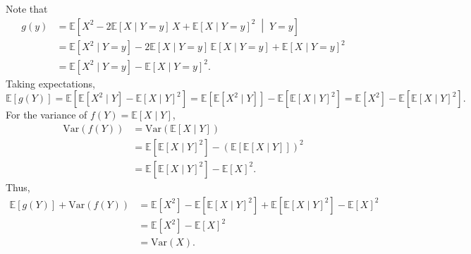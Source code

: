 \documentclass[a4paper,12pt]{article}
\begin{document}
Note that
\begin{align*}
    g(y) &= \mathbb{E}\left[X^2 - 2\mathbb{E}[X \mid Y=y]\,X + \mathbb{E}[X \mid Y=y]^2 \;\middle|\; Y=y\right] \\
         &= \mathbb{E}[X^2 \mid Y=y] - 2\mathbb{E}[X \mid Y=y]\,\mathbb{E}[X \mid Y=y] + \mathbb{E}[X \mid Y=y]^2 \\
         &= \mathbb{E}[X^2 \mid Y=y] - \mathbb{E}[X \mid Y=y]^2.
\end{align*}
Taking expectations,
\[
    \mathbb{E}[g(Y)] = \mathbb{E}\left[\mathbb{E}[X^2 \mid Y] - \mathbb{E}[X \mid Y]^2\right]
    = \mathbb{E}\left[\mathbb{E}[X^2 \mid Y]\right] - \mathbb{E}\left[\mathbb{E}[X \mid Y]^2\right]
    = \mathbb{E}[X^2] - \mathbb{E}\left[\mathbb{E}[X \mid Y]^2\right].
\]
For the variance of $f(Y) = \mathbb{E}[X \mid Y]$,
\begin{align*}
    \mathrm{Var}(f(Y)) &= \mathrm{Var}(\mathbb{E}[X \mid Y]) \\
    &= \mathbb{E}\left[\mathbb{E}[X \mid Y]^2\right] - \left(\mathbb{E}\left[\mathbb{E}[X \mid Y]\right]\right)^2 \\
    &= \mathbb{E}\left[\mathbb{E}[X \mid Y]^2\right] - \mathbb{E}[X]^2.
\end{align*}
Thus,
\begin{align*}
    \mathbb{E}[g(Y)] + \mathrm{Var}(f(Y))
    &= \mathbb{E}[X^2] - \mathbb{E}\left[\mathbb{E}[X \mid Y]^2\right] + \mathbb{E}\left[\mathbb{E}[X \mid Y]^2\right] - \mathbb{E}[X]^2 \\
    &= \mathbb{E}[X^2] - \mathbb{E}[X]^2 \\
    &= \mathrm{Var}(X).
\end{align*}




\end{document}
